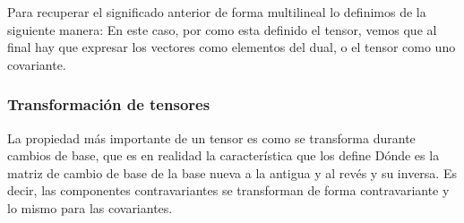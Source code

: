 Para recuperar el significado anterior de forma multilineal lo definimos de la siguiente manera:
En este caso, por como esta definido el tensor, vemos que al final hay que expresar los vectores como elementos del dual, o el tensor como uno covariante.
\subsubsection{Transformación de tensores}
La propiedad más importante de un tensor es como se transforma durante cambios de base, que es en realidad la característica que los define
Dónde  es la matriz de cambio de base de la base nueva a la antigua y  al revés y su inversa.
Es decir, las componentes contravariantes se transforman de forma contravariante y lo mismo para las covariantes.